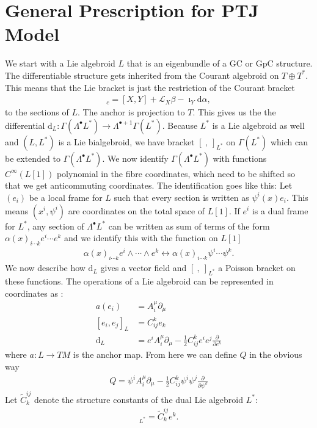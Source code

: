 \documentclass{article}
\newcommand{\TT}{{T\oplus T^*}}
\newcommand{\brac}{[\ ,\ ]}
\newcommand{\Lie}{\mathcal{L}}
\newcommand{\ap}{\alpha}
\newcommand{\bt}{\beta}
\def\w{\wedge}
\newcommand{\p}{\partial}
\newcommand{\rd}{\mathrm{d}}
\newcommand{\se}{\Gamma}
\def\tl{\tilde}
\theoremstyle{definition}
\theoremstyle{definition}
\theoremstyle{remark}
\theoremstyle{ref}
\begin{document}
\section*{General Prescription for PTJ Model}
We start with a Lie algebroid $L$ that is an eigenbundle of a GC or GpC structure. The differentiable structure gets inherited from the Courant algebroid on $\TT$. This means that the Lie bracket is just the restriction of the Courant bracket
\begin{align*}
[X+\ap,Y+\bt]_c=[X,Y]+\Lie_X\bt-\imath_Y\rd\ap,
\end{align*}
to the sections of $L$. The anchor is projection to $T$. This gives us the the differential $\rd_L:\se(\Lambda^\bullet L^*)\rightarrow \Lambda^{\bullet+1} \se(L^*)$. Because $L^*$ is a Lie algebroid as well and $(L,L^*)$ is a Lie bialgebroid, we have bracket $\brac_{L^*}$ on $\se(L^*)$ which can be extended to $\se(\Lambda^\bullet L^*)$. We now identify $\se(\Lambda^\bullet L^*)$ with functions $C^\infty(L[1])$ polynomial in the fibre coordinates, which need to be shifted so that we get anticommuting coordinates. The identification goes like this:
Let $(e_i)$ be a local frame for $L$ such that every section is written as $\psi^i(x)e_i$. This means $(x^i,\psi^i)$ are coordinates on the total space of $L[1]$. If $e^i$ is a dual frame for $L^*$, any section of $\Lambda^\bullet L^*$ can be written as sum of terms of the form $\alpha(x)_{i\cdots k}e^i\cdots e^k$ and we identify this with the function on $L[1]$
\begin{align*}
\alpha(x)_{i\cdots k}e^i\w \cdots\w e^k \longleftrightarrow \alpha(x)_{i\cdots k} \psi^i\cdots \psi^k.
\end{align*}
We now describe how $\rd_L$ gives a vector field and $\brac_{L^*}$ a Poisson bracket on these functions. The operations of a Lie algebroid can be represented in coordinates as \cite{Roytenberg}:
\begin{align*}
a(e_i)&=A_i^\mu \p_\mu\\
[e_i,e_j]_L&=C_{ij}^ke_k\\
\rd_L&=e^iA_i^\mu\p_\mu-\frac{1}{2}C_{ij}^ke^ie^j\frac{\p}{\p e^k}
\end{align*}
where $a:L\rightarrow TM$ is the anchor map. From here we can define $Q$ in the obvious way
\begin{align*}
Q=\psi^iA_i^\mu\p_\mu-\frac{1}{2}C_{ij}^k\psi^i\psi^j\frac{\p}{\p \psi^k}
\end{align*}
Let $\tl{C}^{ij}_k$ denote the structure constants of the dual Lie algebroid $L^*$:
\begin{align*}
[e^i,e^j]_{L^*}=\tl{C}^{ij}_ke^k.
\end{align*}
\end{document}

